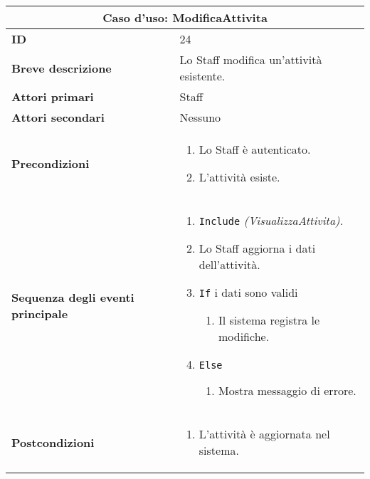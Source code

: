 \documentclass[a4paper]{report}
\begin{document}
\clearpage
\begin{table}[H]
\vspace*{-0cm}
\renewcommand{\arraystretch}{1.9}
\begin{tabular}{|p{3.9cm}|p{9.9cm}|}
\hline
\multicolumn{2}{|c|}{\textbf{Caso d’uso: ModificaAttivita}} \\ \hline
	\textbf{ID} & 24 \\ \hline
	\textbf{Breve descrizione} & Lo Staff modifica un’attività esistente. \\ \hline
	\textbf{Attori primari} & Staff \\ \hline
	\textbf{Attori secondari} & Nessuno \\ \hline
	\textbf{Precondizioni} & \begin{enumerate}[leftmargin=14pt,label=\arabic*.,labelsep=0.5em,topsep=0pt,partopsep=0pt,parsep=0pt,itemsep=0pt]
    \item Lo Staff è autenticato.
    \item L’attività esiste.
\end{enumerate} \\ \hline
	\textbf{Sequenza degli eventi principale} & \begin{enumerate}[leftmargin=14pt,label=\arabic*.,labelsep=0.5em,topsep=0pt,partopsep=0pt,parsep=0pt,itemsep=0pt]
    \item \texttt{Include} \textit{(VisualizzaAttivita)}.
    \item Lo Staff aggiorna i dati dell’attività.
    \item \texttt{If} i dati sono validi
    \begin{enumerate}[label=\arabic{enumi}.\arabic*.,leftmargin=22pt,labelsep=0.5em,topsep=0pt,partopsep=0pt,parsep=0pt,itemsep=0pt]
        \item Il sistema registra le modifiche.
    \end{enumerate}
    \item \texttt{Else}
    \begin{enumerate}[label=\arabic{enumi}.\arabic*.,leftmargin=22pt,labelsep=0.5em,topsep=0pt,partopsep=0pt,parsep=0pt,itemsep=0pt]
        \item Mostra messaggio di errore.
    \end{enumerate}
\end{enumerate} \\ \hline
	\textbf{Postcondizioni} & \begin{enumerate}[label=\arabic*.,leftmargin=14pt,labelsep=0.5em,topsep=0pt,partopsep=0pt,parsep=0pt,itemsep=0pt]
        \item L’attività è aggiornata nel sistema.

\end{enumerate}
\end{tabular}
\end{table}
\end{document}
